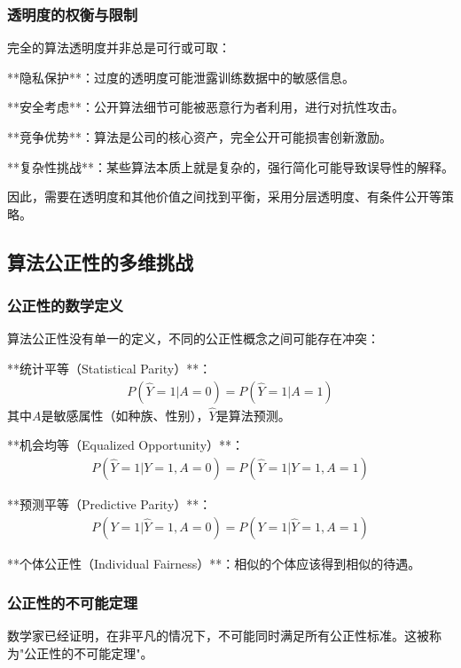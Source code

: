 \subsubsection{透明度的权衡与限制}

完全的算法透明度并非总是可行或可取：

**隐私保护**：过度的透明度可能泄露训练数据中的敏感信息。

**安全考虑**：公开算法细节可能被恶意行为者利用，进行对抗性攻击。

**竞争优势**：算法是公司的核心资产，完全公开可能损害创新激励。

**复杂性挑战**：某些算法本质上就是复杂的，强行简化可能导致误导性的解释。

因此，需要在透明度和其他价值之间找到平衡，采用分层透明度、有条件公开等策略。

\subsection{算法公正性的多维挑战}

\subsubsection{公正性的数学定义}

算法公正性没有单一的定义，不同的公正性概念之间可能存在冲突：

**统计平等（Statistical Parity）**：
\begin{align}
P(\hat{Y} = 1 | A = 0) = P(\hat{Y} = 1 | A = 1)
\end{align}
其中$A$是敏感属性（如种族、性别），$\hat{Y}$是算法预测。

**机会均等（Equalized Opportunity）**：
\begin{align}
P(\hat{Y} = 1 | Y = 1, A = 0) = P(\hat{Y} = 1 | Y = 1, A = 1)
\end{align}

**预测平等（Predictive Parity）**：
\begin{align}
P(Y = 1 | \hat{Y} = 1, A = 0) = P(Y = 1 | \hat{Y} = 1, A = 1)
\end{align}

**个体公正性（Individual Fairness）**：相似的个体应该得到相似的待遇。

\subsubsection{公正性的不可能定理}

数学家已经证明，在非平凡的情况下，不可能同时满足所有公正性标准。这被称为"公正性的不可能定理"。

